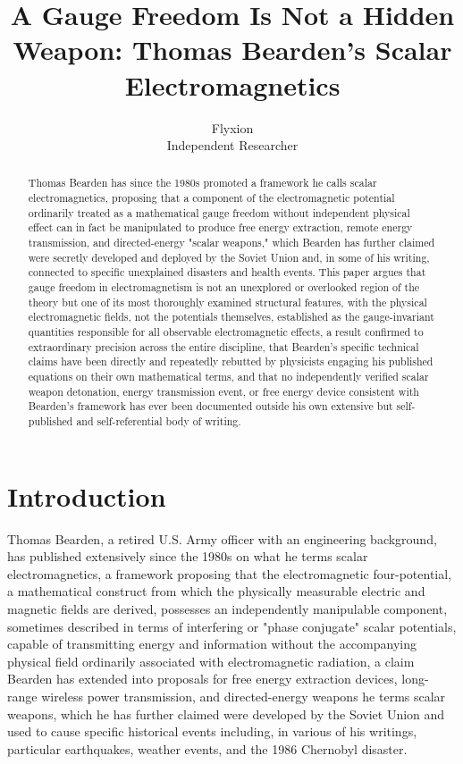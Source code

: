 \documentclass[11pt]{article}
\title{A Gauge Freedom Is Not a Hidden Weapon: Thomas Bearden's Scalar Electromagnetics}
\author{Flyxion \\ \small Independent Researcher}
\date{}
\begin{document}
\maketitle

\begin{abstract}
Thomas Bearden has since the 1980s promoted a framework he calls scalar electromagnetics, proposing that a component of the electromagnetic potential ordinarily treated as a mathematical gauge freedom without independent physical effect can in fact be manipulated to produce free energy extraction, remote energy transmission, and directed-energy "scalar weapons," which Bearden has further claimed were secretly developed and deployed by the Soviet Union and, in some of his writing, connected to specific unexplained disasters and health events. This paper argues that gauge freedom in electromagnetism is not an unexplored or overlooked region of the theory but one of its most thoroughly examined structural features, with the physical electromagnetic fields, not the potentials themselves, established as the gauge-invariant quantities responsible for all observable electromagnetic effects, a result confirmed to extraordinary precision across the entire discipline, that Bearden's specific technical claims have been directly and repeatedly rebutted by physicists engaging his published equations on their own mathematical terms, and that no independently verified scalar weapon detonation, energy transmission event, or free energy device consistent with Bearden's framework has ever been documented outside his own extensive but self-published and self-referential body of writing.
\end{abstract}

\section{Introduction}

Thomas Bearden, a retired U.S. Army officer with an engineering background, has published extensively since the 1980s on what he terms scalar electromagnetics, a framework proposing that the electromagnetic four-potential, a mathematical construct from which the physically measurable electric and magnetic fields are derived, possesses an independently manipulable component, sometimes described in terms of interfering or "phase conjugate" scalar potentials, capable of transmitting energy and information without the accompanying physical field ordinarily associated with electromagnetic radiation, a claim Bearden has extended into proposals for free energy extraction devices, long-range wireless power transmission, and directed-energy weapons he terms scalar weapons, which he has further claimed were developed by the Soviet Union and used to cause specific historical events including, in various of his writings, particular earthquakes, weather events, and the 1986 Chernobyl disaster.
\end{document}
